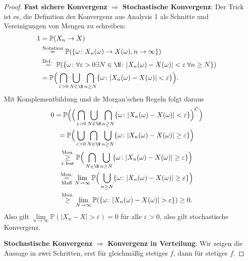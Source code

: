 \begin{proof}
\textbf{Fast sichere Konvergenz } $\Rightarrow$ \textbf{ Stochastische Konvergenz}: Der Trick ist es, die Definition der Konvergenz aus Analysis 1 als Schnitte und Vereinigungen von Mengen zu schreiben:
	\begin{align*}
			1& = \mathbb{P}(X_n \to X)\\
			& \overset{\text{Notation}}{=} \mathbb{P}(\{ \omega \colon X_n(\omega)\to X(\omega), n\to\infty \}) \\
			&\overset{\text{Def. }}{=} \mathbb{P}(\{\omega \colon \forall \varepsilon > 0 \exists N \in \N \colon |X_n(\omega) - X(\omega)| < \varepsilon \: \forall n \geq N \})\\
			&= \mathbb{P}\Big(\bigcap_{\varepsilon > 0} \bigcup_{N \in \N} \bigcap_{n \geq N} \{\omega \colon |X_n(\omega) - X(\omega)| < \varepsilon \}\Big).
		\end{align*}
		Mit Komplementbildung und de Morgan'schen Regeln folgt daraus
		\begin{gather*}
			0 = \mathbb{P}\Big(\Big(\bigcap_{\varepsilon > 0} \bigcup_{N \in \N} \bigcap_{n \geq N} \{\omega \colon |X_n(\omega) - X(\omega)| < \varepsilon \}\Big)^C\Big) \\
			= \mathbb{P}\Big(\bigcup_{\varepsilon > 0} \bigcap_{N \in \N} \bigcup_{n \geq N} \{\omega \colon |X_n(\omega) - X(\omega)| \geq \varepsilon \}\Big)\\
			\overset{\text{Mon.}}{\underset{\varepsilon\text{ fest}}{\geq}} \mathbb{P}\Big(\bigcap_{N \in \N} \bigcup_{n \geq N} \{\omega\colon |X_n(\omega) - X(\omega)| \geq \varepsilon \}\Big)\\
			\overset{\text{Mon.}}{\underset{\text{Maß}}{=}} \lim\limits_{N \to \infty} \mathbb{P}\Big(\bigcup_{n \geq N} \{\omega \colon |X_n(\omega) - X(\omega)| \geq \varepsilon \}\Big)\\ \overset{\text{Mon.}}{\geq} \lim\limits_{N \to \infty} \mathbb{P}(\{ \omega\colon | X_n(\omega) - X(\omega) | > \varepsilon \}) \geq 0.\\
		\end{gather*}
		Also gilt  $\lim\limits_{n \to \infty} \mathbb{P}(|X_n - X| > \varepsilon) = 0$ für alle $\varepsilon > 0$, also gilt stochastische Konvergenz.\smallskip


\textbf{Stochastische Konvergenz } $\Rightarrow$ \textbf{ Konvergenz in Verteilung}: Wir zeigen die Aussage in zwei Schritten, erst f\"ur gleichm\"a\ss ig stetiges $f$, dann f\"ur stetiges $f$.\smallskip


\end{proof}
